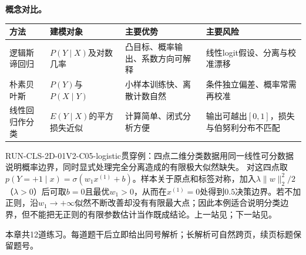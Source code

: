 \label{struct:V2-C05-CH31}
\begin{comparisonbox}
\textbf{概念对比。}
\par\medskip
\small
\begin{tabularx}{\linewidth}{@{}l X X X@{}}
\toprule 方法 & 建模对象 & 主要优势 & 主要风险\\ \midrule
逻辑斯谛回归 & $P(Y\mid X)$及对数几率 & 凸目标、概率输出、系数方向可解释 & 线性logit假设、分离与校准漂移\\
朴素贝叶斯 & $P(Y)$与$P(X\mid Y)$ & 小样本训练快、离散计数自然 & 条件独立偏差、概率常需再校准\\
线性回归作分类 & $E(Y\mid X)$的平方损失近似 & 计算简单、闭式分析方便 & 输出可越出$[0,1]$，损失与伯努利分布不匹配\\
\bottomrule
\end{tabularx}
\end{comparisonbox}

\begin{SLRunningExample}{RUN-CLS-2D-01}{V2-C05-logistic}{贯穿例：四点二维分类数据}{用同一线性可分数据说明概率边界，同时显式处理完全分离造成的有限极大似然缺失。}
对这四点取$p(Y=+1\mid x)=\sigma(w_1x^{(1)}+b)$。样本关于原点和标签对称，加入$\lambda\lVert w\rVert_2^2/2$（$\lambda>0$）后可取$b=0$且最优$w_1>0$，从而在$x^{(1)}=0$处得到$0.5$决策边界。若不加正则，沿$w_1\to+\infty$似然不断改善却没有有限最大点；因此本例适合说明分类边界，但不能把无正则的有限参数估计当作既成结论。上一站见；下一站见。
\end{SLRunningExample}


\label{struct:V2-C05-CH34}
\begin{chapterexercisebox}
\label{struct:V2-C05-CH35}
本章共12道练习。每道题干后立即给出同号解析；长解析可自然跨页，续页标题保留题号。
\end{chapterexercisebox}

